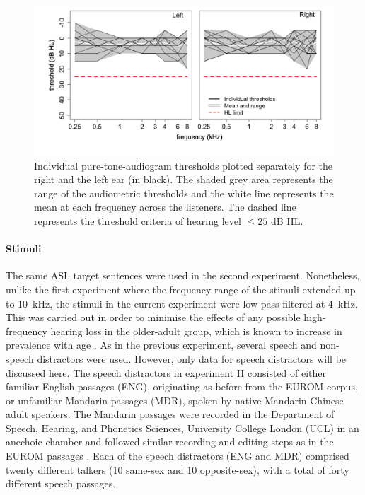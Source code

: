 \documentclass[a4paper, twoside]{templates/ociamthesis}
\begin{document}
\begin{figure}[ht]
\center
\includegraphics[width=\textwidth]{figures/Chapt1/Exp2_PTA.PNG}
\caption{\label{fig:PTA_Exp2}{Individual pure-tone-audiogram thresholds plotted separately for the right and the left ear (in black). The shaded grey area represents the range of the audiometric thresholds and the white line represents the mean at each frequency across the listeners. The dashed line represents the threshold criteria of hearing level $\leq 25$ dB HL.}}
\end{figure}

\hypertarget{stimuli-1}{%
\paragraph{Stimuli}\label{stimuli-1}}

The same ASL target sentences were used in the second experiment. Nonetheless, unlike the first experiment where the frequency range of the stimuli extended up to 10~kHz, the stimuli in the current experiment were low-pass filtered at 4~kHz. This was carried out in order to minimise the effects of any possible high-frequency hearing loss in the older-adult group, which is known to increase in prevalence with age \autocite[e.g.,][]{Brant1990}. As in the previous experiment, several speech and non-speech distractors were used. However, only data for speech distractors will be discussed here. The speech distractors in experiment II consisted of either familiar English passages (ENG), originating as before from the EUROM corpus, or unfamiliar Mandarin passages (MDR), spoken by native Mandarin Chinese adult speakers. The Mandarin passages were recorded in the Department of Speech, Hearing, and Phonetics Sciences, University College London (UCL) in an anechoic chamber and followed similar recording and editing steps as in the EUROM passages \autocite{Chan1995}. Each of the speech distractors (ENG and MDR) comprised twenty different talkers (10 same-sex and 10 opposite-sex), with a total of forty different speech passages.\\
\end{document}
